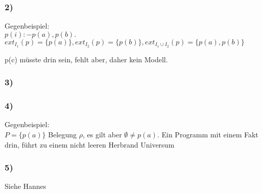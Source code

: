 \documentclass[12pt, a4paper]{article}
\begin{document}
\subsubsection*{2)}
Gegenbeispiel: \\
$p(i) :- p(a), p(b).$ \\
$ext_{I_1}(p) = \{ p(a)\}, ext_{I_2}(p) = \{ p(b) \}, ext_{I_1 \cup I_2}(p) = \{ p(a), p(b) \}$

p(c) müsste drin sein, fehlt aber, daher kein Modell.

\subsubsection*{3)}
\checkmark

\subsubsection*{4)}
Gegenbeispiel: \\
$P = \{ p(a) \}$ Belegung $\rho$, es gilt aber $\emptyset \neq p(a)$.
Ein Programm mit einem Fakt drin, führt zu einem nicht leeren Herbrand Universum

\subsubsection*{5)}
Siehe Hannes
\end{document}
